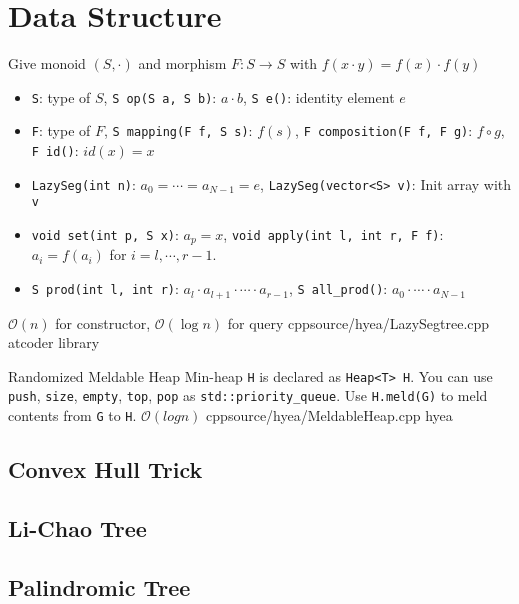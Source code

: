 \documentclass[portrait, 8pt, a4paper, oneside, twocolumn]{extarticle}
\begin{document}
\section{Data Structure}

\tested

{Give monoid $(S, \cdot)$ and morphism $F: S \rightarrow S$ with $f(x \cdot y) = f(x) \cdot f(y)$
\begin{itemize}
    \item \texttt{S}: type of $S$, \texttt{S op(S a, S b)}: $a \cdot b$, \texttt{S e()}: identity element $e$
    \item \texttt{F}: type of $F$, \texttt{S mapping(F f, S s)}: $f(s)$, \texttt{F composition(F f, F g)}: $f \circ g$, \texttt{F id()}: $id(x) = x$
    \item \texttt{LazySeg(int n)}: $a_0 = \cdots = a_{N-1} = e$, \texttt{LazySeg(vector<S> v)}: Init array with \texttt{v}
    \item \texttt{void set(int p, S x)}: $a_p = x$, \texttt{void apply(int l, int r, F f)}: $a_i = f(a_i)$ for $i=l, \cdots, r-1$.
    \item \texttt{S prod(int l, int r)}: $a_l \cdot a_{l+1} \cdot \cdots \cdot a_{r-1}$, \texttt{S all\_prod()}: $a_0 \cdot \cdots \cdot a_{N-1}$
\end{itemize}
}
{$\mathcal{O}(n)$ for constructor, $\mathcal{O}(\log n)$ for query}
{cpp}{source/hyea/LazySegtree.cpp}
{atcoder library}

\tested


\Algorithm
{Randomized Meldable Heap}
{Min-heap \texttt{H} is declared as \texttt{Heap<T> H}. You can use \texttt{push}, \texttt{size}, \texttt{empty}, \texttt{top}, \texttt{pop} as \texttt{std::priority\_queue}. Use \texttt{H.meld(G)} to meld contents from \texttt{G} to \texttt{H}. }
{$\mathcal{O}(log n)$}
{cpp}{source/hyea/MeldableHeap.cpp}
{hyea}

\subsection{Convex Hull Trick}

\added

\subsection{Li-Chao Tree}

\added

\subsection{Palindromic Tree}
\end{document}

